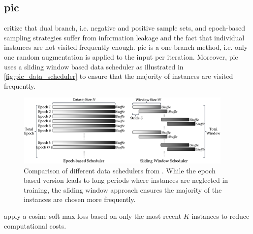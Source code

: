 \subsection{\acl{pic}}\label{subsec:PIC}

\citet{PIC_2020} critize that dual branch, i.e. negative and positive sample sets, 
and epoch-based sampling strategies suffer from information leakage and 
the fact that individual instances are not visited frequently enough.
\ac{pic} is a one-branch method, i.e. only one random augmentation is applied to the input per iteration.
Moreover, \ac{pic} uses a sliding window based data scheduler 
as illustrated in \autoref{fig:pic_data_scheduler}
to ensure that the majority of instances are visited frequently.

\begin{figure}[h] %
    \centering
    \includegraphics[width=300pt]{images/PIC_data_scheduler.png}
    \caption{Comparison of different data schedulers from \citet{PIC_2020}.
    While the epoch based version leads to long periods where instances are neglected in training,
    the sliding window approach ensures the majority of the instances are chosen more frequently.}
    \label{fig:pic_data_scheduler}
\end{figure}

\citeauthor{PIC_2020} apply a cosine soft-max loss based on only the most recent $K$ instances 
to reduce computational costs.
